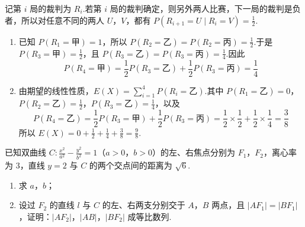 \begin{solution}
记第 \(i\) 局的裁判为 \(R_i\).若第 \(i\) 局的裁判确定，则另外两人比赛，下一局的裁判是负者，所以对任意不同的两人 \(U\)，\(V\)，都有 \(P(R_{i+1}=U\mid R_i=V)=\frac12\).

\begin{enumerate}
\item 已知 \(P(R_1=\text{甲})=1\)，所以 \(P(R_2=\text{乙})=P(R_2=\text{丙})=\frac12\).于是 \(P(R_3=\text{甲})=\frac12\)，且 \(P(R_3=\text{乙})=P(R_3=\text{丙})=\frac14\).因此
\[
P(R_4=\text{甲})=\frac12P(R_3=\text{乙})+\frac12P(R_3=\text{丙})=\frac14
\]
\item 由期望的线性性质，\(E(X)=\sum_{i=1}^4P(R_i=\text{乙})\).其中 \(P(R_1=\text{乙})=0\)，\(P(R_2=\text{乙})=\frac12\)，\(P(R_3=\text{乙})=\frac14\)，以及
\[
P(R_4=\text{乙})=\frac12P(R_3=\text{甲})+\frac12P(R_3=\text{丙})=\frac12\times\frac12+\frac12\times\frac14=\frac38
\]
所以 \(E(X)=0+\frac12+\frac14+\frac38=\frac98\).
\end{enumerate}
\end{solution}

\begin{problem}
已知双曲线 \(C:\frac{x^2}{a^2}-\frac{y^2}{b^2}=1\)（\(a>0\)，\(b>0\)）的左、右焦点分别为 \(F_1\)，\(F_2\)，离心率为 3，直线 \(y=2\) 与 \(C\) 的两个交点间的距离为 \(\sqrt{6}\).

\begin{enumerate}
\item 求 \(a\)，\(b\)；
\item 设过 \(F_2\) 的直线 \(l\) 与 \(C\) 的左、右两支分别交于 \(A\)，\(B\) 两点，且 \(|AF_1|=|BF_1|\)，证明：\(|AF_2|\)，\(|AB|\)，\(|BF_2|\) 成等比数列.
\end{enumerate}
\end{problem}

